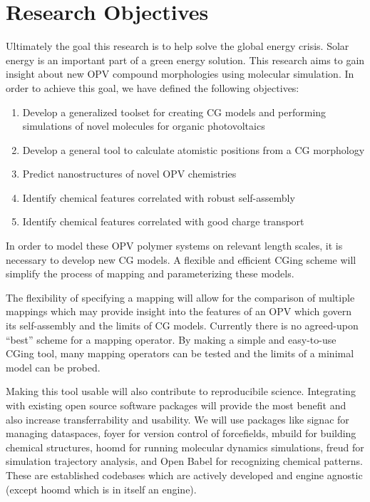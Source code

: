 \section*{Research Objectives}

Ultimately the goal this research is to help solve the global energy crisis. 
Solar energy is an important part of a green energy solution.
This research aims to gain insight about new OPV compound morphologies using molecular simulation.
In order to achieve this goal, we have defined the following objectives:
\begin{enumerate}
    \item {Develop a generalized toolset for creating CG models and performing simulations of novel molecules for organic photovoltaics}
    \item {Develop a general tool to calculate atomistic positions from a CG morphology}
    \item {Predict nanostructures of novel OPV chemistries}
    \item {Identify chemical features correlated with robust self-assembly}
    \item {Identify chemical features correlated with good charge transport}
\end{enumerate}

In order to model these OPV polymer systems on relevant length scales, it is necessary to develop new CG models.
A flexible and efficient CGing scheme will simplify the process of mapping and parameterizing these models.

The flexibility of specifying a mapping will allow for the comparison of multiple mappings which may provide insight into the features of an OPV which govern its self-assembly and the limits of CG models.
Currently there is no agreed-upon ``best'' scheme for a mapping operator.
By making a simple and easy-to-use CGing tool, many mapping operators can be tested and the limits of a minimal model can be probed.

Making this tool usable will also contribute to reproducibile science. 
Integrating with existing open source software packages will provide the most benefit and also increase transferrability and usability.
We will use packages like signac for managing dataspaces, foyer for version control of forcefields, mbuild for building chemical structures, hoomd for running molecular dynamics simulations, freud for simulation trajectory analysis, and Open Babel for recognizing chemical patterns\cite{signac, foyer, mbuild, hoomd, freud, openbabel}.
These are established codebases which are actively developed and engine agnostic (except hoomd which is in itself an engine).

